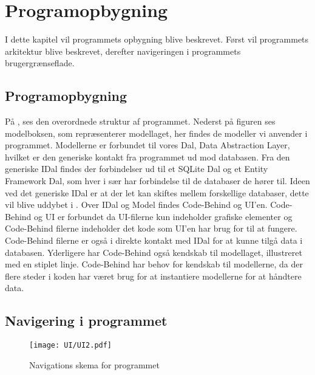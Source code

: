 \chapter{Programopbygning}

I dette kapitel vil programmets opbygning blive beskrevet. Først vil programmets arkitektur blive beskrevet, derefter navigeringen i programmets brugergrænseflade.


\section{Programopbygning}\label{sec:programopbygning}


På , ses den overordnede struktur af programmet.
Nederst på figuren ses modelboksen, som repræsenterer modellaget, her findes de modeller vi anvender i programmet.
Modellerne er forbundet til vores Dal, Data Abstraction Layer, hvilket er den generiske kontakt fra programmet ud mod databasen.
Fra den generiske IDal findes der forbindelser ud til et SQLite Dal og et Entity Framework Dal, som hver i sær har forbindelse til de databaser de hører til.
Ideen ved det generiske IDal er at der let kan skiftes mellem forskellige databaser, dette vil blive uddybet i .
Over IDal og Model findes Code-Behind og UI'en.
Code-Behind og UI er forbundet da UI-filerne kun indeholder grafiske elementer og Code-Behind filerne indeholder det kode som UI'en har brug for til at fungere.
Code-Behind filerne er også i direkte kontakt med IDal for at kunne tilgå data i databasen.
Yderligere har Code-Behind også kendskab til modellaget, illustreret med en stiplet linje.
Code-Behind har behov for kendskab til modellerne, da der flere steder i koden har været brug for at instantiere modellerne for at håndtere data. 
\section{Navigering i programmet}
\begin{figure}[H]
\hspace*{-2cm}
\texttt{[image: UI/UI2.pdf]}
\label{img:programNavigation}
\vspace{-310pt}
\caption{Navigations skema for programmet}
\vspace{-20pt}
\end{figure}

